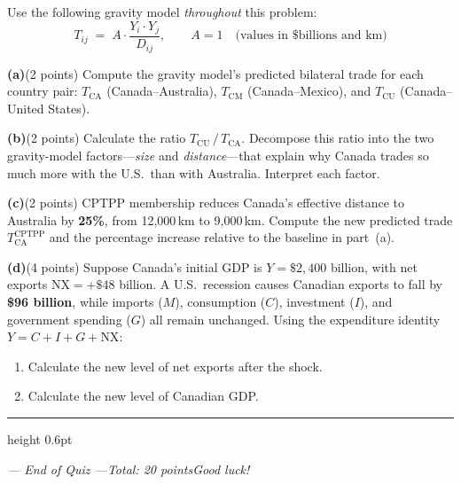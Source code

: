 \documentclass[11pt]{article}
\begin{document}
\noindent Use the following gravity model \emph{throughout} this problem:
\[T_{ij} \;=\; A\cdot\frac{Y_i\cdot Y_j}{D_{ij}},\qquad
  A = 1\quad\text{(values in \$billions and km)}\]

\bigskip

\noindent\textbf{(a)}\quad(2 points)\enspace
Compute the gravity model's predicted bilateral trade for each country pair:
$T_{\text{CA}}$ (Canada--Australia), $T_{\text{CM}}$ (Canada--Mexico), and
$T_{\text{CU}}$ (Canada--United States).

\vspace{.5cm}

\noindent\textbf{(b)}\quad(2 points)\enspace
Calculate the ratio $T_{\text{CU}}\,/\,T_{\text{CA}}$.
Decompose this ratio into the two gravity-model factors---\emph{size} and
\emph{distance}---that explain why Canada trades so much more with the U.S.\
than with Australia. Interpret each factor.

\vspace{.5cm}

\noindent\textbf{(c)}\quad(2 points)\enspace
CPTPP membership reduces Canada's effective distance to Australia by
\textbf{25\%}, from 12{,}000\,km to 9{,}000\,km. Compute the new predicted
trade $T_{\text{CA}}^{\text{CPTPP}}$ and the percentage increase relative to
the baseline in part~(a).

\vspace{.5cm}

\noindent\textbf{(d)}\quad(4 points)\enspace
Suppose Canada's initial GDP is $Y = \$2{,}400$ billion, with net exports
$\text{NX} = +\$48$ billion. A U.S.\ recession causes Canadian exports to fall
by \textbf{\$96 billion}, while imports ($M$), consumption ($C$), investment
($I$), and government spending ($G$) all remain unchanged. Using the expenditure
identity $Y = C + I + G + \text{NX}$:
\begin{enumerate}[label=(\roman*),leftmargin=2em,itemsep=1.5em]
  \item Calculate the new level of net exports after the shock.
  \item Calculate the new level of Canadian GDP.
\end{enumerate}






\vspace{1em}
{\color{UNBCGold}\hrule height 0.6pt}
\begin{center}
\small\itshape
--- End of Quiz ---\qquad Total: 20 points\qquad Good luck!
\end{center}
\end{document}
